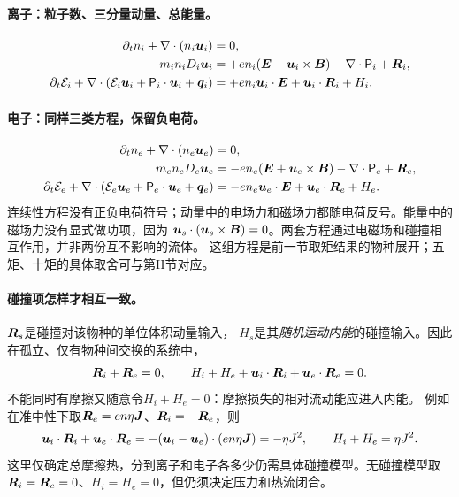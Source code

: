 \documentclass[UTF8,a4paper,11pt,openany,fontset=fandol]{ctexbook}
\begin{document}
\paragraph{离子：粒子数、三分量动量、总能量。}
\begin{align}
 \partial_t n_i+\nabla\cdot(n_i\bm{u}_i)&=0,
 \label{eq:ion-cont-full}\\
 m_in_iD_i\bm{u}_i
 &=+en_i(\bm{E}+\bm{u}_i\times\bm{B})-\nabla\cdot\mathsf P_i+\bm{R}_i,
 \label{eq:ion-mom-full}\\
 \partial_t\mathcal E_i+
 \nabla\cdot(\mathcal E_i\bm{u}_i+\mathsf P_i\cdot\bm{u}_i+\bm{q}_i)
 &=+en_i\bm{u}_i\cdot\bm{E}+\bm{u}_i\cdot\bm{R}_i+H_i.
 \label{eq:ion-energy-full}
\end{align}
\paragraph{电子：同样三类方程，保留负电荷。}
\begin{align}
 \partial_t n_e+\nabla\cdot(n_e\bm{u}_e)&=0,
 \label{eq:electron-cont-full}\\
 m_en_eD_e\bm{u}_e
 &=-en_e(\bm{E}+\bm{u}_e\times\bm{B})-\nabla\cdot\mathsf P_e+\bm{R}_e,
 \label{eq:electron-mom-full}\\
 \partial_t\mathcal E_e+
 \nabla\cdot(\mathcal E_e\bm{u}_e+\mathsf P_e\cdot\bm{u}_e+\bm{q}_e)
 &=-en_e\bm{u}_e\cdot\bm{E}+\bm{u}_e\cdot\bm{R}_e+H_e.
 \label{eq:electron-energy-full}
\end{align}
连续性方程没有正负电荷符号；动量中的电场力和磁场力都随电荷反号。能量中的磁场力没有显式做功项，因为
$\bm{u}_s\cdot(\bm{u}_s\times\bm{B})=0$。两套方程通过电磁场和碰撞相互作用，并非两份互不影响的流体。
这组方程是前一节取矩结果的物种展开；五矩、十矩的具体取舍可与\citet{Wang2015}第II节对应。

\paragraph{碰撞项怎样才相互一致。}
$\bm{R}_s$是碰撞对该物种的单位体积动量输入，
$H_s$是其\emph{随机运动内能}的碰撞输入。因此在孤立、仅有物种间交换的系统中，
\begin{equation}
 \bm{R}_i+\bm{R}_e=0,\qquad
 H_i+H_e+\bm{u}_i\cdot\bm{R}_i+\bm{u}_e\cdot\bm{R}_e=0.
 \label{eq:twofluid-collision-consistency}
\end{equation}
不能同时有摩擦又随意令$H_i+H_e=0$：摩擦损失的相对流动能应进入内能。
例如在准中性下取$\bm{R}_e=en\eta\bm{J}$、$\bm{R}_i=-\bm{R}_e$，则
\begin{equation}
 \bm{u}_i\cdot\bm{R}_i+\bm{u}_e\cdot\bm{R}_e
 =-(\bm{u}_i-\bm{u}_e)\cdot(en\eta\bm{J})=-\eta J^2,
 \qquad H_i+H_e=\eta J^2.
\end{equation}
这里仅确定总摩擦热，分到离子和电子各多少仍需具体碰撞模型。无碰撞模型取$\bm{R}_i=\bm{R}_e=0$、$H_i=H_e=0$，但仍须决定压力和热流闭合。
\end{document}
